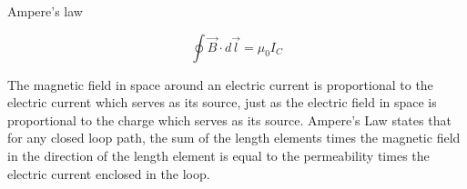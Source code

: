 
\begin{center}
{\Large Ampere's law }  
\end{center}

\begin{equation}\label{Integ}
    \oint \overrightarrow{B}\cdot d\overrightarrow{\! l}=
   \mu _0 I_C  
   \end{equation}
\begin{center}
{\large The magnetic field in space around an electric current is proportional to the electric current which serves as its source, just as the electric field in space is proportional to the charge which serves as its source. Ampere's Law states that for any closed loop path, the sum of the length elements times the magnetic field in the direction of the length element is equal to the permeability times the electric current enclosed in the loop. } 
\end{center}
